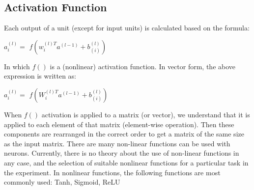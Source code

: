 \subsection{Activation Function}
Each output of a unit (except for input units) is calculated based on the formula:
\begin{center}
	$a_{i}^{(l)} = $ $f(w_{i}^{(l)T}a^{(l-1)} + b_{(i)}^{(l)} )$
\end{center}
In which $f()$ is a (nonlinear) activation function. In vector form, the above expression is written as:
\begin{center}
	$a_{i}^{(l)} = $ $f(W_{i}^{(l)T}a^{(l-1)} + b_{(i)}^{(l)} )$
\end{center}
When $f()$ activation is applied to a matrix (or vector), we understand that it is applied to each element of that matrix (element-wise operation). Then these components are rearranged in the correct order to get a matrix of the same size as the input matrix.
There are many non-linear functions can be used with neurons. Currently, there is no theory about the use of non-linear functions in any case, and the selection of suitable nonlinear functions for a particular task in the experiment. In nonlinear functions, the following functions are most commonly used: Tanh, Sigmoid, ReLU
